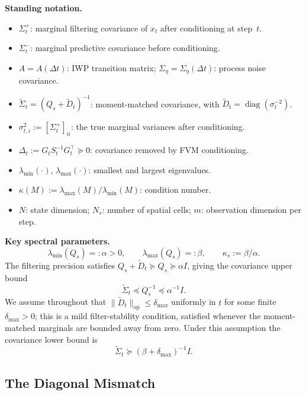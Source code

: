 \documentclass{article}
\theoremstyle{plain}
\theoremstyle{definition}
\theoremstyle{remark}
\DeclareMathOperator{\diag}{diag}
\newcommand{\opnorm}[1]{\lVert #1 \rVert_{\mathrm{op}}}
\begin{document}
\noindent\textbf{Standing notation.}
\begin{itemize}
\item $\Sigma_t^+$: marginal filtering covariance of $x_t$ after conditioning at step~$t$.
\item $\Sigma_t^-$: marginal predictive covariance before conditioning.
\item $A = A(\Delta t)$: IWP transition matrix; $\Sigma_\eta = \Sigma_\eta(\Delta t)$: process noise covariance.
\item $\widetilde{\Sigma}_t = (Q_s + \widetilde{D}_t)^{-1}$: moment-matched covariance, with $\widetilde{D}_t = \diag(\sigma_t^{-2})$.
\item $\sigma_{t,i}^2 := [\Sigma_t^+]_{ii}$: the true marginal variances after conditioning.
\item $\Delta_t := G_t S_t^{-1} G_t^\top \succeq 0$: covariance removed by FVM conditioning.
\item $\lambda_{\min}(\cdot)$, $\lambda_{\max}(\cdot)$: smallest and largest eigenvalues.
\item $\kappa(M) := \lambda_{\max}(M)/\lambda_{\min}(M)$: condition number.
\item $N$: state dimension; $N_s$: number of spatial cells; $m$: observation dimension per step.
\end{itemize}

\noindent\textbf{Key spectral parameters.}
\begin{equation}\label{eq:spectral}
\lambda_{\min}(Q_s) =: \alpha > 0, \qquad \lambda_{\max}(Q_s) =: \beta, \qquad \kappa_s := \beta/\alpha.
\end{equation}
The filtering precision satisfies $Q_s + \widetilde{D}_t \succeq Q_s \succeq \alpha I$, giving the covariance upper bound
\begin{equation}\label{eq:cov_upper}
\widetilde{\Sigma}_t \preceq Q_s^{-1} \preceq \alpha^{-1} I.
\end{equation}
We assume throughout that $\opnorm{\widetilde{D}_t} \leq \delta_{\max}$ uniformly in $t$ for some finite $\delta_{\max} > 0$; this is a mild filter-stability condition, satisfied whenever the moment-matched marginals are bounded away from zero. Under this assumption the covariance lower bound is
\begin{equation}\label{eq:cov_lower}
\widetilde{\Sigma}_t \succeq (\beta + \delta_{\max})^{-1} I.
\end{equation}

\subsection{The Diagonal Mismatch}
\label{app:mm-diagonal}
\end{document}

